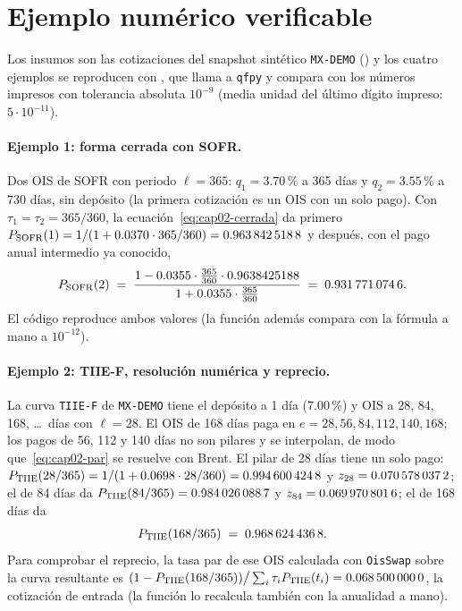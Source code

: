 \section{Ejemplo numérico verificable}\label{sec:cap02-ejemplo}

Los insumos son las cotizaciones del snapshot sintético \texttt{MX-DEMO}
() y los cuatro ejemplos se reproducen con
, que llama a \texttt{qfpy} y compara con los números
impresos con tolerancia absoluta $10^{-9}$ (media unidad del último dígito impreso: $5\cdot10^{-11}$).

\paragraph{Ejemplo 1: forma cerrada con SOFR.}
Dos OIS de SOFR con periodo $\ell=365$: $q_1=3.70\,\%$ a 365 días y $q_2=3.55\,\%$ a 730 días, sin depósito
(la primera cotización es un OIS con un solo pago). Con $\tau_1=\tau_2=365/360$, la ecuación~\eqref{eq:cap02-cerrada}
da primero $\DF{\cSOFR}{1} = 1/(1+0.0370\cdot 365/360) = \verif{cap02-sofr-df-365}{0.9638425188}$ y después, con el pago
anual intermedio ya conocido,
\[
  \DF{\cSOFR}{2} \;=\; \frac{1 - 0.0355\cdot\frac{365}{360}\cdot 0.9638425188}{1 + 0.0355\cdot\frac{365}{360}}
  \;=\; \verif{cap02-sofr-df-730}{0.9317710746}.
\]
El código reproduce ambos valores (la función  además
compara con la fórmula a mano a $10^{-12}$).

\paragraph{Ejemplo 2: TIIE-F, resolución numérica y reprecio.}
La curva \texttt{TIIE-F} de \texttt{MX-DEMO} tiene el depósito a 1 día (7.00\,\%) y OIS a 28, 84, 168, \dots\ días
con $\ell=28$. El OIS de 168 días paga en $e = 28, 56, 84, 112, 140, 168$; los pagos de 56, 112 y 140 días no son
pilares y se interpolan, de modo que~\eqref{eq:cap02-par} se resuelve con Brent. El pilar de 28 días tiene un solo
pago: $\DF{\cTIIE}{28/365} = 1/(1+0.0698\cdot 28/360) = \verif{cap02-tiie-df-28}{0.9946004248}$ y
$z_{28} = \verif{cap02-tiie-zero-28}{0.0705780372}$; el de 84 días da $\DF{\cTIIE}{84/365} =
\verif{cap02-tiie-df-84}{0.9840260887}$ y $z_{84} = \verif{cap02-tiie-zero-84}{0.0699708016}$; el de 168 días
da
\[
  \DF{\cTIIE}{168/365} \;=\; \verif{cap02-tiie-df-168}{0.9686244368}.
\]
Para comprobar el reprecio, la tasa par de ese OIS calculada con \texttt{OisSwap} sobre la curva resultante es
$(1-\DF{\cTIIE}{168/365})\big/\sum_i\tau_i\DF{\cTIIE}{t_i} = \verif{cap02-tiie-par-168}{0.0685000000}$,
la cotización de entrada (la función  lo recalcula
también con la anualidad a mano).

